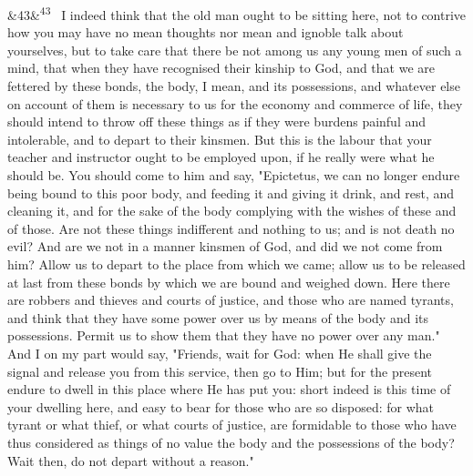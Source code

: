 \documentclass[12pt]{article}
\newcommand{\para}[1][]{\par\noindent\ifx&#1&\else\textsuperscript{\footnotesize #1}~\fi}
\begin{document}
\para[43] I indeed think that the old man ought to be sitting here, not to contrive how you may have no mean thoughts nor mean and ignoble talk about yourselves, but to take care that there be not among us any young men of such a mind, that when they have recognised their kinship to God, and that we are fettered by these bonds, the body, I mean, and its possessions, and whatever else on account of them is necessary to us for the economy and commerce of life, they should intend to throw off these things as if they were burdens painful and intolerable, and to depart to their kinsmen. But this is the labour that your teacher and instructor ought to be employed upon, if he really were what he should be. You should come to him and say, "Epictetus, we can no longer endure being bound to this poor body, and feeding it and giving it drink, and rest, and cleaning it, and for the sake of the body complying with the wishes of these and of those. Are not these things indifferent and nothing to us; and is not death no evil? And are we not in a manner kinsmen of God, and did we not come from him? Allow us to depart to the place from which we came; allow us to be released at last from these bonds by which we are bound and weighed down. Here there are robbers and thieves and courts of justice, and those who are named tyrants, and think that they have some power over us by means of the body and its possessions. Permit us to show them that they have no power over any man." And I on my part would say, "Friends, wait for God: when He shall give the signal and release you from this service, then go to Him; but for the present endure to dwell in this place where He has put you: short indeed is this time of your dwelling here, and easy to bear for those who are so disposed: for what tyrant or what thief, or what courts of justice, are formidable to those who have thus considered as things of no value the body and the possessions of the body? Wait then, do not depart without a reason."
\end{document}
